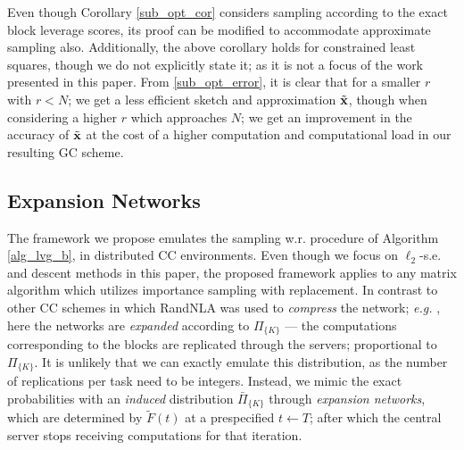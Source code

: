 \documentclass[journal,letterpaper,onecolumn,twoside,nofonttune]{IEEEtran}
\newcommand{\xb}{\bold{x}}
\newcommand{\xbt}{\tilde{\xb}}
\newcommand{\Pib}{\bar{\Pi}}
\newcommand{\Ft}{\tilde{F}}
\begin{document}
Even though Corollary \ref{sub_opt_cor} considers sampling according to the exact block leverage scores, its proof can be modified to accommodate approximate sampling also. Additionally, the above corollary holds for constrained least squares, though we do not explicitly state it; as it is not a focus of the work presented in this paper. From \eqref{sub_opt_error}, it is clear that for a smaller $r$ with $r<N$; we get a less efficient sketch and approximation $\xbt$, though when considering a higher $r$ which approaches $N$; we get an improvement in the accuracy of $\xbt$ at the cost of a higher computation and computational load in our resulting GC scheme.

\subsection{Expansion Networks}
\label{exp_netw_sec}

The framework we propose emulates the sampling w.r. procedure of Algorithm \ref{alg_lvg_b}, in distributed CC environments. Even though we focus on $\ell_2$-s.e. and descent methods in this paper, the proposed framework applies to any matrix algorithm which utilizes importance sampling with replacement. In contrast to other CC schemes in which RandNLA was used to \textit{compress} the network; \textit{e.g.} \cite{CPH20a,CPH20c,RCHV23}, here the networks are \textit{expanded} according to $\Pi_{\{K\}}$ --- the computations corresponding to the blocks are replicated through the servers; proportional to $\Pi_{\{K\}}$. It is unlikely that we can exactly emulate this distribution, as the number of replications per task need to be integers. Instead, we mimic the exact probabilities with an \textit{induced} distribution $\Pib_{\{K\}}$ through \textit{expansion networks}, which are determined by $\Ft(t)$ at a prespecified $t\gets T$; after which the central server stops receiving computations for that iteration.
\end{document}
